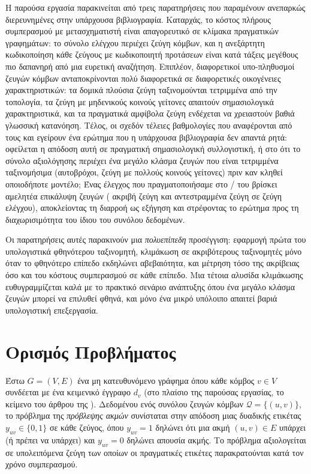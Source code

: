 Η παρούσα εργασία παρακινείται από τρεις παρατηρήσεις που παραμένουν ανεπαρκώς
διερευνημένες στην υπάρχουσα βιβλιογραφία.
Καταρχάς, το κόστος πλήρους συμπερασμού με
μετασχηματιστή είναι απαγορευτικό σε κλίμακα πραγματικών γραφημάτων: το σύνολο ελέγχου
 περιέχει \TestPairs{} ζεύγη κόμβων, και η ανεξάρτητη κωδικοποίηση κάθε
ζεύγους με κωδικοποιητή προτάσεων είναι κατά τάξεις μεγέθους πιο δαπανηρή από μια
ευρετική αναζήτηση.
Επιπλέον, διαφορετικοί υπο-πληθυσμοί ζευγών κόμβων
ανταποκρίνονται πολύ διαφορετικά σε διαφορετικές οικογένειες χαρακτηριστικών: τα
δομικά πλούσια ζεύγη ταξινομούνται τετριμμένα από την τοπολογία, τα ζεύγη 
με μηδενικούς κοινούς γείτονες απαιτούν σημασιολογικά χαρακτηριστικά,
και τα πραγματικά αμφίβολα ζεύγη ενδέχεται να χρειαστούν βαθιά γλωσσική κατανόηση.
Τέλος, οι σχεδόν τέλειες βαθμολογίες που αναφέρονται από τους \textcite{phan2023link}
και \textcite{tran2023text} εγείρουν ένα ερώτημα που η υπάρχουσα
βιβλιογραφία δεν απαντά ρητά: οφείλεται η απόδοση αυτή σε πραγματική σημασιολογική
συλλογιστική, ή στο ότι το σύνολο αξιολόγησης περιέχει ένα μεγάλο κλάσμα ζευγών που
είναι τετριμμένα ταξινομήσιμα (αυτοβρόχοι, ζεύγη με πολλούς κοινούς γείτονες) πριν
καν κληθεί οποιοδήποτε μοντέλο; Ένας έλεγχος  που πραγματοποιήσαμε
στο \texttt{}/\texttt{} του  βρίσκει
αμελητέα επικάλυψη ζευγών (\LeakageExact{} ακριβή ζεύγη και \LeakageReversed{} αντεστραμμένα ζεύγη σε \TestPairs{}
ζεύγη ελέγχου), αποκλείοντας τη διαρροή ως εξήγηση και στρέφοντας το ερώτημα προς τη
διαχωρισιμότητα του ίδιου του συνόλου δεδομένων.

Οι παρατηρήσεις αυτές παρακινούν μια \textit{πολυεπίπεδη} προσέγγιση: εφαρμογή
πρώτα του υπολογιστικά φθηνότερου ταξινομητή, κλιμάκωση σε ακριβότερους ταξινομητές
μόνο όταν το φθηνότερο επίπεδο εκδηλώνει αβεβαιότητα, και μέτρηση τόσο της ακρίβειας
όσο και του κόστους συμπερασμού σε κάθε επίπεδο.
Μια τέτοια αλυσίδα κλιμάκωσης
ευθυγραμμίζεται καλά με το πρακτικό σενάριο ανάπτυξης όπου ένα μεγάλο κλάσμα ζευγών
μπορεί να επιλυθεί φθηνά, και μόνο ένα μικρό υπόλοιπο απαιτεί βαριά υπολογιστική
επεξεργασία.


\section{Ορισμός Προβλήματος}
\label{sec:problem-definition}

Έστω $G = (V, E)$ ένα μη κατευθυνόμενο γράφημα όπου κάθε κόμβος $v \in V$ συνδέεται
με ένα κειμενικό έγγραφο $d_v$ (στο πλαίσιο της παρούσας εργασίας, το κείμενο του
άρθρου της ). Δεδομένου ενός συνόλου ζευγών κόμβων $\mathcal{Q} =
\{(u, v)\}$, το πρόβλημα της \textit{πρόβλεψης ακμών} συνίσταται στην απόδοση μιας
δυαδικής ετικέτας $y_{uv} \in \{0, 1\}$ σε κάθε ζεύγος, όπου $y_{uv} = 1$ δηλώνει
ότι μια ακμή $(u, v) \in E$ υπάρχει (ή πρέπει να υπάρχει) και $y_{uv} = 0$ δηλώνει
απουσία ακμής.
Το πρόβλημα αξιολογείται σε υπολειπόμενα ζεύγη των οποίων οι
πραγματικές ετικέτες παρακρατούνται κατά τον χρόνο συμπερασμού.

